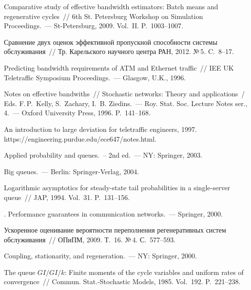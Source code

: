 \begin{multicols}{2}
{{\begin{thebibliography}{99}
 Comparative
study of effective bandwidth estimators: Batch means and
regenerative cycles~// 6th St. Petersburg
Workshop on Simulation Proceedings.~--- St-Petersburg, 2009.
 Vol.~II. P.~1003--1007.
 
 Сравнение двух оценок
эффективной пропускной способности системы обслуживания~// Тр.
Карельского научного центра РАН, 2012. №\,5. C.~8--17.

Predicting bandwidth requirements of ATM
 and Ethernet traffic~// IEE UK Teletraffic Symposium Proceedings.~--- Glasgow, U.K., 1996.

 Notes on   effective bandwiths~// Stochastic
networks: Theory and applications~/ Eds. F.\,P.~Kelly, S.~Zachary, 
I.~B. Ziedins.~--- Roy. Stat. Soc. Lecture Notes ser., 4.~---
Oxford University Press, 1996. P.~141--168.


 An introduction to large deviation for
teletraffic engineers, 1997.
{\sf https://\linebreak engineering.purdue.edu/ece647/notes.html}.


  Applied probability and queues.~-- 2nd ed.~--- NY: Springer, 2003.

 Big queues.~--- Berlin:  Springer-Verlag, 2004.

 Logarithmic asymptotics for steady-state
tail probabilities in a single-server queue~// JAP, 1994. Vol.~31.
P.~131--156.

.  Performance guarantees in communication
networks.~--- Springer, 2000.


 Ускоренное оценивание
вероятности переполнения  регенеративных систем обслуживания~//
ОПиПМ, 2009. Т.~16. №\,4. С.~577--593.




  Coupling, stationarity, and regeneration.~--- NY: Springer, 2000.

 The queue $GI/GI/k$:  Finite moments of the cycle
variables and uniform rates of convergence~// Commun.
Stat.-Stochastic Models, 1985. Vol.~192. P.~221--238.


\end{thebibliography}}}
\end{multicols}
